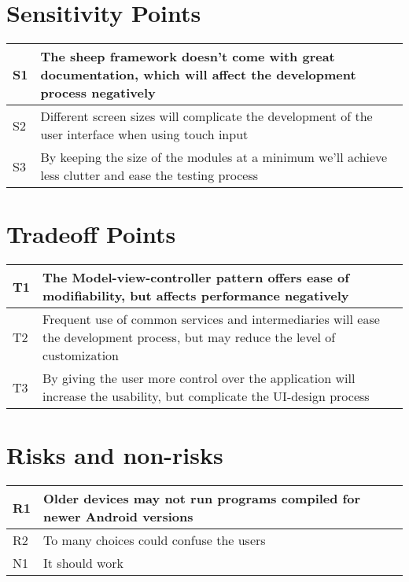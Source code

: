 \section{Sensitivity Points}

\begin{tabular}{|m{}|m{}|}
  \hline
  S1 & The sheep framework doesn't come with great documentation, which will affect the development process negatively \\ \hline
  S2 & Different screen sizes will complicate the development of the user interface when using touch input \\ \hline
  S3 & By keeping the size of the modules at a minimum we'll achieve less clutter and ease the testing process \\ \hline 
\end{tabular}

\section{Tradeoff Points}
\begin{tabular}{|m{}|m{}|}
  \hline
  T1 & The Model-view-controller pattern offers ease of modifiability, but affects performance negatively \\ \hline
  T2 & Frequent use of common services and intermediaries will ease the development process, but may reduce the
  level of customization \\ \hline
  T3 & By giving the user more control over the application will increase the usability, but complicate the UI-design process \\ \hline
\end{tabular}

\section{Risks and non-risks}
\begin{tabular}{|m{}|m{}|}
  \hline
  R1 & Older devices may not run programs compiled for newer Android versions \\ \hline
  R2 & To many choices could confuse the users \\ \hline
  N1 & It should work \\ \hline
\end{tabular}
